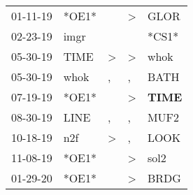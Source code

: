 \begin{supertabular}{p{0.07\textwidth}p{0.06\textwidth}p{0.02\textwidth}p{0.02\textwidth}p{0.06\textwidth}}
          01-11-19\textsuperscript{} &                            *OE1* &                  &     \textgreater &           GLOR\textsuperscript{} \\
          02-23-19\textsuperscript{} &           imgr\textsuperscript{} &                  &                  &                            *CS1* \\
          05-30-19\textsuperscript{} &           TIME\textsuperscript{} &     \textgreater &     \textgreater &           whok\textsuperscript{} \\
          05-30-19\textsuperscript{} &           whok\textsuperscript{} &                , &                , &           BATH\textsuperscript{} \\
          07-19-19\textsuperscript{} &                            *OE1* &                  &     \textgreater &  \textbf{TIME\textsuperscript{}} \\
          08-30-19\textsuperscript{} &           LINE\textsuperscript{} &                , &                , &           MUF2\textsuperscript{} \\
          10-18-19\textsuperscript{} &            n2f\textsuperscript{} &     \textgreater &                , &           LOOK\textsuperscript{} \\
          11-08-19\textsuperscript{} &                            *OE1* &                  &     \textgreater &           sol2\textsuperscript{} \\
          01-29-20\textsuperscript{} &                            *OE1* &                  &     \textgreater &           BRDG\textsuperscript{} \\
\end{supertabular}

